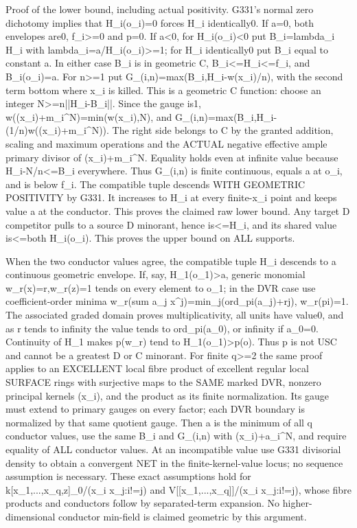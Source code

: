 Proof of the lower bound, including actual positivity. G331's normal zero dichotomy implies that H\_i(o\_i)=0 forces H\_i identically0. If a=0, both envelopes are0, f\_i\textgreater{}=0 and p=0. If a\textless{}0, for H\_i(o\_i)\textless{}0 put B\_i=lambda\_i H\_i with lambda\_i=a/H\_i(o\_i)\textgreater{}=1; for H\_i identically0 put B\_i equal to constant a. In either case B\_i is in geometric C, B\_i\textless{}=H\_i\textless{}=f\_i, and B\_i(o\_i)=a. For n\textgreater{}=1 put
G\_(i,n)=max(B\_i,H\_i-w(x\_i)/n),
with the second term bottom where x\_i is killed. This is a geometric C function: choose an integer N\textgreater{}=n||H\_i-B\_i||. Since the gauge is1, w((x\_i)+m\_i\textasciicircum{}N)=min(w(x\_i),N), and
G\_(i,n)=max(B\_i,H\_i-(1/n)w((x\_i)+m\_i\textasciicircum{}N)).
The right side belongs to C by the granted addition, scaling and maximum operations and the ACTUAL negative effective ample primary divisor of (x\_i)+m\_i\textasciicircum{}N. Equality holds even at infinite value because H\_i-N/n\textless{}=B\_i everywhere. Thus G\_(i,n) is finite continuous, equals a at o\_i, and is below f\_i. The compatible tuple descends WITH GEOMETRIC POSITIVITY by G331. It increases to H\_i at every finite-x\_i point and keeps value a at the conductor. This proves the claimed raw lower bound. Any target D competitor pulls to a source D minorant, hence is\textless{}=H\_i, and its shared value is\textless{}=both H\_i(o\_i). This proves the upper bound on ALL supports.

When the two conductor values agree, the compatible tuple H\_i descends to a continuous geometric envelope. If, say, H\_1(o\_1)\textgreater{}a, generic monomial w\_r(x)=r,w\_r(z)=1 tends on every element to o\_1; in the DVR case use coefficient-order minima w\_r(sum a\_j x\textasciicircum{}j)=min\_j(ord\_pi(a\_j)+rj), w\_r(pi)=1. The associated graded domain proves multiplicativity, all units have value0, and as r tends to infinity the value tends to ord\_pi(a\_0), or infinity if a\_0=0. Continuity of H\_1 makes p(w\_r) tend to H\_1(o\_1)\textgreater{}p(o). Thus p is not USC and cannot be a greatest D or C minorant. For finite q\textgreater{}=2 the same proof applies to an EXCELLENT local fibre product of excellent regular local SURFACE rings with surjective maps to the SAME marked DVR, nonzero principal kernels (x\_i), and the product as its finite normalization. Its gauge must extend to primary gauges on every factor; each DVR boundary is normalized by that same quotient gauge. Then a is the minimum of all q conductor values, use the same B\_i and G\_(i,n) with (x\_i)+a\_i\textasciicircum{}N, and require equality of ALL conductor values. At an incompatible value use G331 divisorial density to obtain a convergent NET in the finite-kernel-value locus; no sequence assumption is necessary. These exact assumptions hold for k[x\_1,...,x\_q,z]\_0/(x\_i x\_j:i!=j) and V[[x\_1,...,x\_q]]/(x\_i x\_j:i!=j), whose fibre products and conductors follow by separated-term expansion. No higher-dimensional conductor min-field is claimed geometric by this argument.

